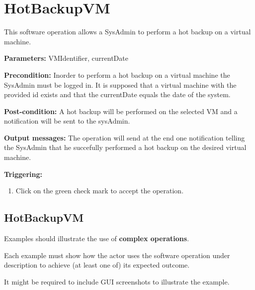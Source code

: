 \section{HotBackupVM}
\label{operation:HotBackupVM}
This software operation allows a SysAdmin to perform a hot backup on a virtual
machine.
\begin{description}

\item \textbf{Parameters:} VMIdentifier, currentDate
\item \textbf{Precondition:} Inorder to perform a hot backup on a virtual
machine the SysAdmin must be logged in. It is supposed that a virtual machine
with the provided id exists and that the currentDate equals the date of the
system.
\item \textbf{Post-condition:} A hot backup will be performed on the selected
VM and a notification will be sent to the sysAdmin.
\item \textbf{Output messages:} The operation will send at the end one
notification telling the SysAdmin that he succefully performed a hot backup on
the desired virtual machine.

\item \textbf{Triggering:}
\begin{enumerate}
\item Click on the green check mark to accept the operation.
\end{enumerate}

 
\end{description}

 
\subsection{HotBackupVM}
Examples should illustrate the use of \textbf{complex operations}.

Each example must show how the actor uses the software operation under
description to achieve (at least one of) its expected outcome.

It might be required to include GUI screenshots to illustrate the example.







